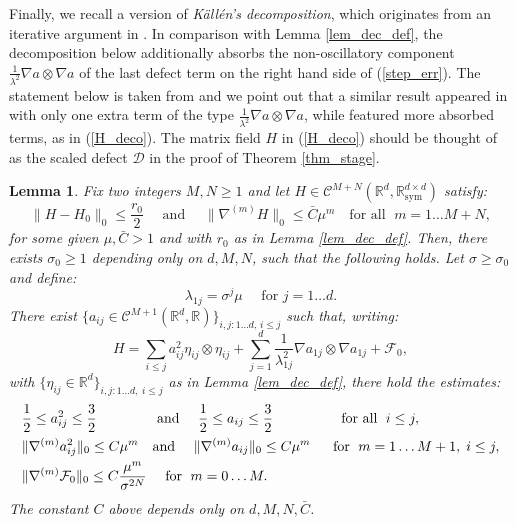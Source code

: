 \documentclass[reqno,twoside,11pt]{amsart}
\newcommand{\sym}{\mathrm{sym}}
\newcommand{\R}{\mathbb{R}}
\numberwithin{equation}{section}
\theoremstyle{plain}
\newtheorem{lemma}[theorem]{Lemma}
\theoremstyle{definition}
\begin{document}
\medskip

\noindent Finally, we recall a version of {\em K\"all\'en's
decomposition}, which originates from an iterative argument in 
\cite{Kallen}. In comparison with Lemma \ref{lem_dec_def}, the
decomposition below additionally absorbs the
non-oscillatory component  $\frac{1}{\lambda^2}\nabla a\otimes\nabla a$ 
of the last defect term on the right hand side of (\ref{step_err}).
The statement below is taken from \cite[Lemma 6.1]{lew_full2d2k} and
we point out that a similar result appeared in \cite[Proposition
3.1]{in_lew2} with only one extra term of the type
$\frac{1}{\lambda^2}\nabla a\otimes\nabla a$, while \cite[Lemma
2.2]{CHI2} featured more absorbed terms, as in (\ref{H_deco}).
The matrix field $H$ in (\ref{H_deco})
should be thought of as the scaled defect $\mathcal{D}$ in the proof
of Theorem \ref{thm_stage}. 

\begin{lemma}\label{lem_Kallen}
Fix two integers $M, N\geq 1$ and let $H\in \mathcal{C}^{M+N}(\R^d,\R^{d\times d}_\sym)$ satisfy:
\begin{equation}\label{ass_H0}
\|H-H_0\|_0\leq \frac{r_0}{2} \quad\mbox{ and }\quad 
\|\nabla^{(m)}H\|_0\leq \bar C\mu^m \quad \mbox{for all } \; m=1\ldots M+N,
\end{equation}
 for some given $\mu, \bar C>1$ and with $r_0$ as in Lemma \ref{lem_dec_def}.
Then, there exists $\sigma_0 \geq 1$ depending only on $d, M, N$,
such that the following holds. Let $\sigma\geq \sigma_0$ and define:
$$\lambda_{1j} = \sigma^j\mu \quad\mbox{ for } j=1\ldots d.$$
There exist $\{a_{ij}\in \mathcal{C}^{M+1}(\R^d,\R)\}_{i,j:1\ldots d, \, i\leq j}$
such that, writing:
\begin{equation}\label{H_deco}
H= \sum_{i\leq j} a_{ij}^2\eta_{ij}\otimes\eta_{ij} + \sum_{j=1}^d\frac{1}{\lambda_{1j}^2}\nabla
a_{1j}\otimes\nabla a_{1j} + \mathcal{F}_0,
\end{equation}
with $\{\eta_{ij}\in\R^d\}_{i,j:1\ldots d, \;i\leq j}$ as in Lemma \ref{lem_dec_def}, there hold the estimates:
\begin{equation}\label{Ebounds}
\begin{split}
&  \frac{1}{2}\leq a_{ij}^2\leq \frac{3}{2} \hspace{1.4cm} \mbox{ and }\quad 
\frac{1}{2}\leq a_{ij}\leq \frac{3}{2} \hspace{1.6cm} \mbox{ for all } \;  i\leq j,\\
& \|\nabla^{(m)} a_{ij}^2\|_0\leq C\mu^m\quad 
\mbox{and } \quad \|\nabla^{(m)} a_{ij}\|_0\leq C\mu^m \;\quad\mbox{ for }\;
 m=1\ldots M+1,\;  i\leq j,\\
& \|\nabla^{(m)}\mathcal{F}_0\|_0\leq C\frac{\mu^m}{\sigma^{2N}}\quad\mbox{ for } \; m=0\ldots M.  
\end{split}
\end{equation}
The constant $C$ above depends only on $d, M, N, \bar C$.
\end{lemma}
\end{document}
